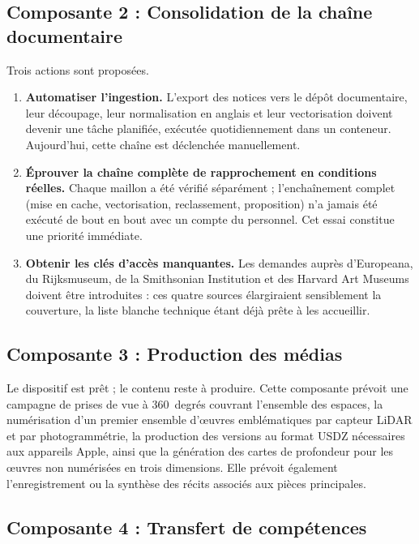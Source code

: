 \subsection{Composante 2 : Consolidation de la chaîne documentaire}

Trois actions sont proposées.

\begin{enumerate}
  \item \textbf{Automatiser l'ingestion.} L'export des notices vers le dépôt
        documentaire, leur découpage, leur normalisation en anglais et leur
        vectorisation doivent devenir une tâche planifiée, exécutée
        quotidiennement dans un conteneur. Aujourd'hui, cette chaîne est
        déclenchée manuellement.

  \item \textbf{Éprouver la chaîne complète de rapprochement en conditions
        réelles.} Chaque maillon a été vérifié séparément ; l'enchaînement
        complet (mise en cache, vectorisation, reclassement, proposition) n'a jamais été exécuté de bout en bout avec un compte du personnel. Cet
        essai constitue une priorité immédiate.

  \item \textbf{Obtenir les clés d'accès manquantes.} Les demandes auprès
        d'Europeana, du Rijksmuseum, de la Smithsonian Institution et des
        Harvard Art Museums doivent être introduites : ces quatre sources
        élargiraient sensiblement la couverture, la liste blanche technique
        étant déjà prête à les accueillir.
\end{enumerate}

\subsection{Composante 3 : Production des médias}

Le dispositif est prêt ; le contenu reste à produire. Cette composante prévoit
une campagne de prises de vue à 360~degrés couvrant l'ensemble des espaces, la
numérisation d'un premier ensemble d'œuvres emblématiques par capteur LiDAR et
par photogrammétrie, la production des versions au format USDZ nécessaires aux
appareils Apple, ainsi que la génération des cartes de profondeur pour les
œuvres non numérisées en trois dimensions. Elle prévoit également
l'enregistrement ou la synthèse des récits associés aux pièces principales.

\subsection{Composante 4 : Transfert de compétences}

